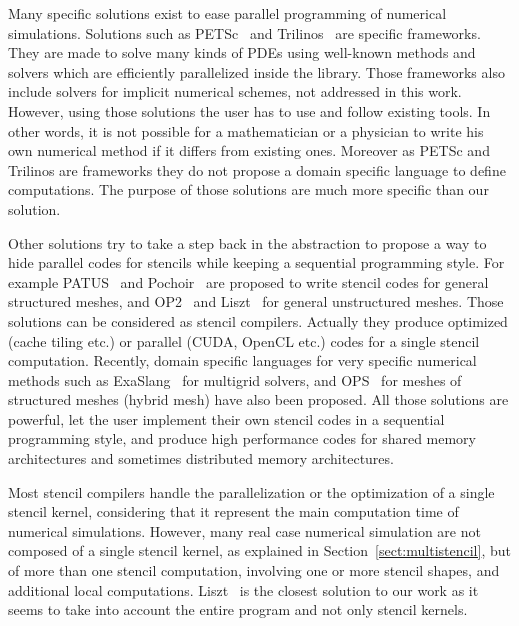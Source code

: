 
Many specific solutions exist to ease parallel programming of numerical simulations. Solutions such as PETSc~\cite{petsc-efficient} and Trilinos~\cite{Trilinos-Overview} are specific frameworks. They are made to solve many kinds of PDEs using well-known methods and solvers which are efficiently parallelized inside the library. Those frameworks also include solvers for implicit numerical schemes, not addressed in this work. However, using those solutions the user has to use and follow existing tools. In other words, it is not possible for a mathematician or a physician to write his own numerical method if it differs from existing ones. Moreover as PETSc and Trilinos are frameworks they do not propose a domain specific language to define computations. The purpose of those solutions are much more specific than our solution.

Other solutions try to take a step back in the abstraction to propose a way to hide parallel codes for stencils while keeping a sequential programming style. For example PATUS~\cite{citeulike12258902} and Pochoir~\cite{spaaTangCKLL11} are proposed to write stencil codes for general structured meshes, and OP2~\cite{Giles2011} and Liszt~\cite{DeVito2011LDS} for general unstructured meshes. Those solutions can be considered as stencil compilers. Actually they produce optimized (cache tiling etc.) or parallel (CUDA, OpenCL etc.) codes for a single stencil computation.
Recently, domain specific languages for very specific numerical methods such as ExaSlang~\cite{Schmitt:2014:EDL:2691166.2691171} for multigrid solvers, and OPS~\cite{Reguly:2014:ODS:2691166.2691173} for meshes of structured meshes (hybrid mesh) have also been proposed. 
All those solutions are powerful, let the user implement their own stencil codes in a sequential programming style, and produce high performance codes for shared memory architectures and sometimes distributed memory architectures. 

Most stencil compilers handle the parallelization or the optimization of a single stencil kernel, considering that it represent the main computation time of numerical simulations. However, many real case numerical simulation are not composed of a single stencil kernel, as explained in Section~\ref{sect:multistencil}, but of more than one stencil computation, involving one or more stencil shapes, and additional local computations. %
Liszt~\cite{DeVito2011LDS} is the closest solution to our work as it seems to take into account the entire program and not only stencil kernels. 

